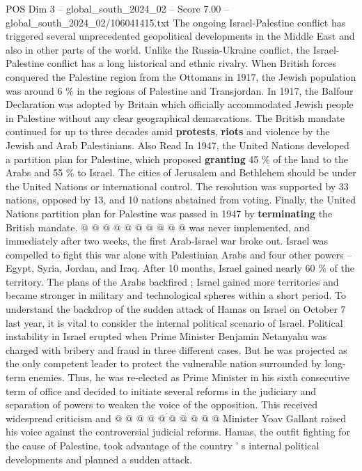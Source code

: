 \begin{textsample}{POS Dim 3 – global\_south\_2024\_02 – Score 7.00 – global\_south\_2024\_02/106041415.txt}  \label{ex:f3_pos_373}
The ongoing Israel-Palestine conflict has triggered several unprecedented geopolitical developments in the Middle East and also in other parts of the world.
Unlike the Russia-Ukraine conflict, the Israel-Palestine conflict has a long historical and ethnic rivalry.
When British forces conquered the Palestine region from the Ottomans in 1917, the Jewish population was around 6 \% in the regions of Palestine and Transjordan.
In 1917, the Balfour Declaration was adopted by Britain which officially accommodated Jewish people in Palestine without any clear geographical demarcations.
The British mandate continued for up to three decades amid \textbf{protests}, \textbf{riots} and violence by the Jewish and Arab Palestinians.
Also Read In 1947, the United Nations developed a partition plan for Palestine, which proposed \textbf{granting} 45 \% of the land to the Arabs and 55 \% to Israel.
The cities of Jerusalem and Bethlehem should be under the United Nations or international control.
The resolution was supported by 33 nations, opposed by 13, and 10 nations abstained from voting.
Finally, the United Nations partition plan for Palestine was passed in 1947 by \textbf{terminating} the British mandate. @ @ @ @ @ @ @ @ @ @ was never implemented, and immediately after two weeks, the first Arab-Israel war broke out.
Israel was compelled to fight this war alone with Palestinian Arabs and four other powers -- Egypt, Syria, Jordan, and Iraq.
After 10 months, Israel gained nearly 60 \% of the territory.
The plans of the Arabs backfired ; Israel gained more territories and became stronger in military and technological spheres within a short period.
To understand the backdrop of the sudden attack of Hamas on Israel on October 7 last year, it is vital to consider the internal political scenario of Israel.
Political instability in Israel erupted when Prime Minister Benjamin Netanyahu was charged with bribery and fraud in three different cases.
But he was projected as the only competent leader to protect the vulnerable nation surrounded by long-term enemies.
Thus, he was re-elected as Prime Minister in his sixth consecutive term of office and decided to initiate several reforms in the judiciary and separation of powers to weaken the voice of the opposition.
This received widespread criticism and @ @ @ @ @ @ @ @ @ @ Minister Yoav Gallant raised his voice against the controversial judicial reforms.
Hamas, the outfit fighting for the cause of Palestine, took advantage of the country ' s internal political developments and planned a sudden attack.

\end{textsample}
